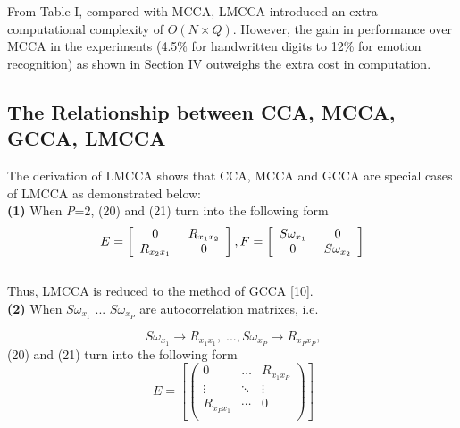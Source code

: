 \documentclass[journal]{IEEEtran}
\begin{document}
From Table I, compared with MCCA, LMCCA introduced an extra computational complexity of $O(N \times Q)$. However, the gain in performance over MCCA in the experiments (4.5\% for handwritten digits to 12\% for emotion recognition) as shown in Section IV outweighs the extra cost in computation.
\subsection{The Relationship between CCA, MCCA, GCCA, LMCCA}
The derivation of LMCCA shows that CCA, MCCA and GCCA are special cases of LMCCA as demonstrated below:\\

\textbf{(1)} When \emph{P}=2, (20) and (21) turn into the following form
\begin{equation}
E = \left[ {\begin{array}{*{20}{c}}
   0  \\
   {{R_{{x_2}{x_1}}}}  \\
\end{array}} \right.\left. {\begin{array}{*{20}{c}}
   {{R_{{x_1}{x_2}}}}  \\
   {\rm{0}}  \\
\end{array}} \right],F = \left[ {\begin{array}{*{20}{c}}
   {S{\omega _{{x_1}}}}  \\
   0  \\
\end{array}} \right.\left. {\begin{array}{*{20}{c}}
   0  \\
   {S{\omega _{{x_2}}}}  \\
\end{array}} \right]
 \end{equation}\\\indent
Thus, LMCCA is reduced to the method of GCCA [10].\\

\textbf{(2)} When $ S{\omega _{x_1}}$ ... $ S{\omega _{x_P}}$ are autocorrelation matrixes, i.e.

\begin{equation} \ S{\omega_{x_1}} \to {R_{{x_1}{x_1}}},\;...,S{\omega_{{x_P}}} \to {R_{{x_P}{x_P}}}, \end{equation}
(20) and (21) turn into the following form
\begin{equation} \ E = \left[ {\left( {\begin{array}{*{20}{c}}
   0 &  \ldots  & {{R_{{x_1}{x_P}}}}  \\
    \vdots  &  \ddots  &  \vdots   \\
   {{R_{{x_P}{x_1}}}} &  \cdots  & 0  \\
\end{array}} \right)} \right] \end{equation}
\end{document}
